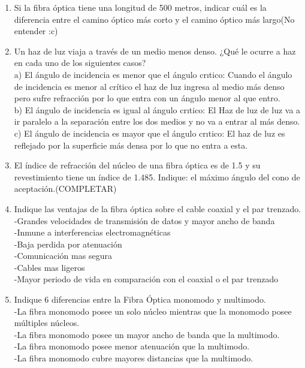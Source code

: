 \documentclass{udparticle}
\begin{document}
\begin{enumerate}
\item Si la fibra óptica tiene una longitud de 500 metros, indicar cuál es la diferencia entre el camino 
óptico más corto y el camino  óptico más largo(No entender :c)\\
\item  Un haz de luz viaja a través de un medio menos denso. ¿Qué le ocurre a haz en cada uno de los siguientes casos? \\
a) El ángulo de incidencia es menor que el ángulo crıtico: Cuando el ángulo de incidencia es menor al crítico el haz de luz ingresa al medio más denso pero sufre refracción por lo que entra con un ángulo menor al que entro.\\
b) El ángulo de incidencia es igual al ángulo crıtico: El Haz de luz de luz va a ir paralelo a la separación entre los dos medios y no va a entrar al más denso.\\
c) El ángulo de incidencia es mayor que el ángulo crıtico: El haz de luz es reflejado por la superficie más densa por lo que no entra a esta.\\
\item  El índice de refracción del núcleo de una fibra óptica es de 1.5 y su revestimiento tiene un índice de 1.485. Indique: el máximo ángulo del cono de aceptación.(COMPLETAR)\\
\item  Indique las ventajas de la fibra óptica sobre el cable coaxial y el par trenzado.\\
-Grandes velocidades de transmisión de datos y mayor ancho de banda\\
-Inmune a interferencias electromagnéticas\\
-Baja perdida por atenuación\\
-Comunicación mas segura\\
-Cables mas ligeros\\
-Mayor periodo de vida en comparación con el coaxial o el par trenzado\\
\item  Indique 6 diferencias entre la Fibra Óptica monomodo y multimodo.\\
-La fibra monomodo posee un solo núcleo mientras que la monomodo posee múltiples núcleos.\\
-La fibra monomodo posee un mayor ancho de banda que la multimodo.\\
-La fibra monomodo posee menor atenuación que la multimodo.\\
-La fibra monomodo cubre mayores distancias que la multimodo.\\

\end{enumerate}
\end{document}
